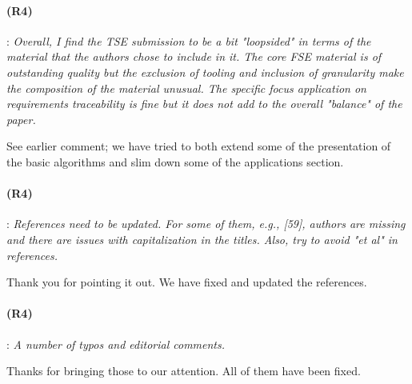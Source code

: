 \documentclass{article}
\begin{document}
\paragraph{(R4)}: \textit{Overall, I find the TSE submission to be a bit "loopsided" in terms of the material that the authors chose to include in it. The core FSE material is of outstanding quality but the exclusion of tooling and inclusion of granularity make the composition of the material unusual. The specific focus application on requirements traceability is fine but it does not add to the overall "balance" of the paper.}
\vspace{0.05in}

See earlier comment; we have tried to both extend some of the presentation of the basic algorithms and slim down some of the applications section.

\paragraph{(R4)}: \textit{References need to be updated. For some of them, e.g., [59], authors are missing and there are issues with capitalization in the titles. Also, try to avoid "et al" in references.}
\vspace{0.05in}

Thank you for pointing it out. We have fixed and updated the references.

\paragraph{(R4)}: \textit{A number of typos and editorial comments.}
\vspace{0.05in}

Thanks for bringing those to our attention. All of them have been fixed.
\end{document}
